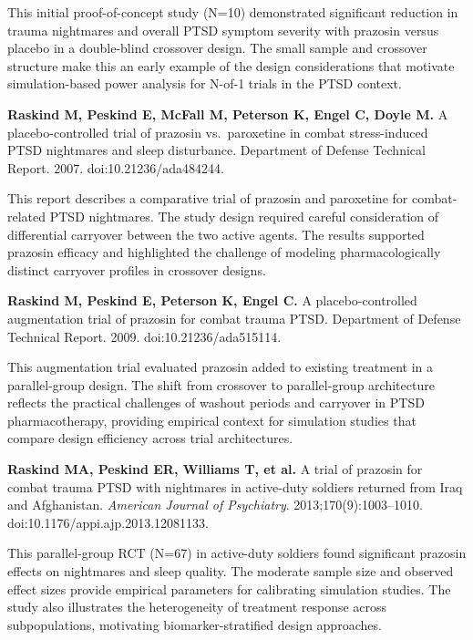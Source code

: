 \documentclass[11pt]{article}
\begin{document}
\smallskip\noindent
This initial proof-of-concept study (N=10) demonstrated
significant reduction in trauma nightmares and overall PTSD
symptom severity with prazosin versus placebo in a
double-blind crossover design. The small sample and
crossover structure make this an early example of the
design considerations that motivate simulation-based power
analysis for N-of-1 trials in the PTSD context.

\medskip
\textbf{Raskind M, Peskind E, McFall M, Peterson K, Engel
C, Doyle M.} A placebo-controlled trial of prazosin vs.\
paroxetine in combat stress-induced PTSD nightmares and
sleep disturbance. Department of Defense Technical Report.
2007. doi:10.21236/ada484244.

\smallskip\noindent
This report describes a comparative trial of prazosin and
paroxetine for combat-related PTSD nightmares. The study
design required careful consideration of differential
carryover between the two active agents. The results
supported prazosin efficacy and highlighted the challenge of
modeling pharmacologically distinct carryover profiles in
crossover designs.

\medskip
\textbf{Raskind M, Peskind E, Peterson K, Engel C.} A
placebo-controlled augmentation trial of prazosin for
combat trauma PTSD. Department of Defense Technical Report.
2009. doi:10.21236/ada515114.

\smallskip\noindent
This augmentation trial evaluated prazosin added to
existing treatment in a parallel-group design. The shift
from crossover to parallel-group architecture reflects the
practical challenges of washout periods and carryover in
PTSD pharmacotherapy, providing empirical context for
simulation studies that compare design efficiency across
trial architectures.

\medskip
\textbf{Raskind MA, Peskind ER, Williams T, et al.} A trial
of prazosin for combat trauma PTSD with nightmares in
active-duty soldiers returned from Iraq and Afghanistan.
\textit{American Journal of Psychiatry}.
2013;170(9):1003--1010.
doi:10.1176/appi.ajp.2013.12081133.

\smallskip\noindent
This parallel-group RCT (N=67) in active-duty soldiers
found significant prazosin effects on nightmares and sleep
quality. The moderate sample size and observed effect sizes
provide empirical parameters for calibrating simulation
studies. The study also illustrates the heterogeneity of
treatment response across subpopulations, motivating
biomarker-stratified design approaches.
\end{document}

